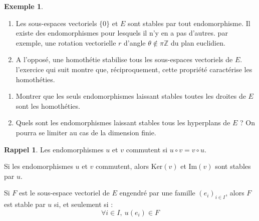 \documentclass[french]{article}
\newcommand{\Z}{\mathbb{Z}}
\renewcommand{\ker}{\text{Ker}}
\theoremstyle{plain}
\theoremstyle{definition}
\newtheorem*{ex}{Exemple}
\newtheorem*{rappel}{Rappel}
\theoremstyle{remark}
\begin{document}
\begin{ex}
	\begin{enumerate}
		\item Les sous-espaces vectoriels $\{0\}$ et $E$ sont stables par tout endomorphisme. Il existe des endomorphismes pour lesquels il n'y en a pas d'autres. par exemple, une rotation vectorielle $r$ d'angle $\theta\notin\pi\Z$ du plan euclidien.
		\item A l'opposé, une homothétie stabilise tous les sous-espaces vectoriels de $E$. l'exercice qui suit montre que, réciproquement, cette propriété caractérise les homothéties.
	\end{enumerate}
\end{ex}

\begin{exo}
	\begin{enumerate}
		\item Montrer que les seuls endomorphismes laissant stables toutes les droites de $E$ sont les homothéties.
		\item Quels sont les endomorphismes laissant stables tous les hyperplans de $E$ ? On pourra se limiter au cas de la dimension finie.
	\end{enumerate}
\end{exo}

\begin{rappel}
	Les endomorphismes $u$ et $v$ commutent si $u\circ v=v\circ u$.
\end{rappel}

\begin{prop}%
	Si les endomorphismes $u$ et $v$ commutent, alors $\ker(v)$ et $\text{Im}(v)$ sont stables par $u$.
\end{prop}

\begin{prop}%
	Si $F$ est le sous-espace vectoriel de $E$ engendré par une famille $(e_i)_{i\in I}$, alors $F$ est stable par $u$ si, et seulement si : $$\forall i\in I,\ u(e_i)\in F$$
\end{prop}
\end{document}
